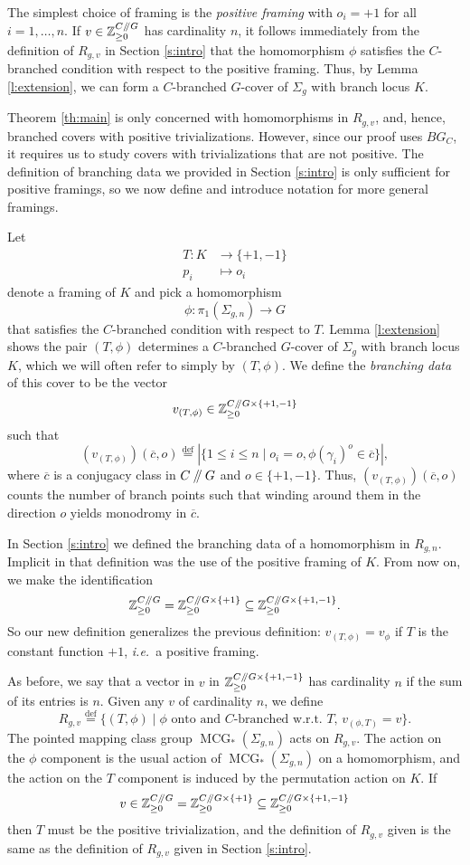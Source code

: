 \documentclass[10pt,twocolumn,amsmath,amssymb,aps,pra,secnumarabic,
    nofootinbib,groupedaddress]{revtex4-1}
\newcommand{\ie}{\emph{i.e.~}}
\newcommand{\defeq}{\stackrel{\mathrm{def}}=}
\newcommand{\Z}{\mathbb{Z}}
\newcommand{\sslash}{\mathbin{/\mkern-5mu/}}
\newcommand{\MCG}{\operatorname{MCG}}
\newcommand{\ov}[1]{\overline{#1}}
\begin{document}
The simplest choice of framing is the \emph{positive framing} with $o_i=+1$ for all $i=1,\dots,n$.  If $v \in \Z_{\geq 0}^{C\sslash G}$ has cardinality $n$, it follows immediately from the definition of $R_{g,v}$ in Section \ref{s:intro} that the homomorphism $\phi$ satisfies the $C$-branched condition with respect to the positive framing.  Thus, by Lemma \ref{l:extension}, we can form a $C$-branched $G$-cover of $\Sigma_g$ with branch locus $K$.

Theorem \ref{th:main} is only concerned with homomorphisms in $R_{g,v}$, and, hence, branched covers with positive trivializations.  However, since our proof uses $BG_C$, it requires us to study covers with trivializations that are not positive.  The definition of branching data we provided in Section \ref{s:intro} is only sufficient for positive framings, so we now define and introduce notation for more general framings.

Let
\[ \begin{aligned} T: K &\to \{+1,-1 \} \\ p_i &\mapsto o_i \end{aligned} \]
denote a framing of $K$ and pick a homomorphism
\[ \phi: \pi_1(\Sigma_{g,n}) \to G \]
that satisfies the $C$-branched condition with respect to $T$.  Lemma \ref{l:extension} shows the pair $(T,\phi)$ determines a $C$-branched $G$-cover of $\Sigma_g$ with branch locus $K$, which we will often refer to simply by $(T,\phi)$.  We define the \emph{branching data} of this cover to be the vector
\[ v_{(T,\phi)} \in \Z_{\geq 0}^{C\sslash G \times \{+1,-1\}} \]
such that
\[ (v_{(T,\phi)})(\ov{c},o) \defeq |\{ 1 \leq i \leq n \mid o_i = o, \phi(\gamma_i)^o \in \ov{c} \}|, \]
where $\ov{c}$ is a conjugacy class in $C\sslash G$ and $o \in \{+1,-1\}$.  Thus, $(v_{(T,\phi)})(\ov{c},o)$ counts the number of branch points such that winding around them in the direction $o$ yields monodromy in $\ov{c}$.

In Section \ref{s:intro} we defined the branching data of a homomorphism in $R_{g,n}$.  Implicit in that definition was the use of the positive framing of $K$.  From now on, we make the identification
\[  \Z_{\geq 0}^{C\sslash G} = \Z_{\geq 0}^{C\sslash G \times \{+1\}} \subseteq \Z_{\geq 0}^{C\sslash G \times \{+1,-1\}}. \]
So our new definition generalizes the previous definition: $v_{(T,\phi)} = v_\phi$ if $T$ is the constant function $+1$, \ie a positive framing.

As before, we say that a vector in $v$ in $\Z_{\geq 0}^{C\sslash G \times \{+1,-1\}}$ has cardinality $n$ if the sum of its entries is $n$.  Given any $v$ of cardinality $n$, we define
\[ R_{g,v} \defeq \{ (T,\phi) \mid \phi \text{ onto and $C$-branched w.r.t. $T$, } v_{(\phi,T)} = v \}. \]
The pointed mapping class group $\MCG_*(\Sigma_{g,n})$ acts on $R_{g,v}$.  The action on the $\phi$ component is the usual action of $\MCG_*(\Sigma_{g,n})$ on a homomorphism, and the action on the $T$ component is induced by the permutation action on $K$.  If
\[ v \in \Z_{\geq 0}^{C\sslash G} = \Z_{\geq 0}^{C\sslash G \times \{+1\}} \subseteq \Z_{\geq 0}^{C\sslash G \times \{+1,-1\}} \]
then $T$ must be the positive trivialization, and the definition of $R_{g,v}$ given is the same as the definition of $R_{g,v}$ given in Section \ref{s:intro}.
\end{document}
